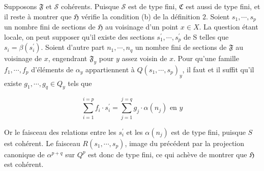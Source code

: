 Supposons $\mathfrak{F}$ et $\mathcal{S}$ cohérents. Puisque $\mathcal{S}$ est de type fini, $\mathfrak{C}$ est aussi de type fini, et il reste à montrer que $\mathfrak{H}$ vérifie la condition (b) de la définition $2 .$ Soient $s_{1}, \cdots, s_{p}$ un nombre fini de sections de $\mathfrak{H}$ au voisinage d'un point $x \in X .$ La question étant locale, on peut supposer qu'il existe des sections $s_{1}^{\prime}, \cdots, s_{p}^{\prime}$ de S telles que $s_{i}=\beta\left(s_{i}^{\prime}\right)$. Soient d'autre part $n_{1}, \cdots, n_{q}$ un nombre fini de sections de $\mathfrak{F}$ au voisinage de $x$, engendrant $\mathfrak{F}_{y}$ pour $y$ assez voisin de $x$. Pour qu'une famille $f_{1}, \cdots, f_{p}$ d'éléments de $\alpha_{y}$ appartiennent à $Q\left(s_{1}, \cdots, s_{p}\right)_{y}$, il faut et il suffit qu'il existe $g_{1}, \cdots, g_{q} \in Q_{y}$ tels que

$$
\sum_{i=1}^{i=p} f_{i} \cdot s_{i}^{\prime}=\sum_{j=1}^{j=q} g_{j} \cdot \alpha\left(n_{j}\right) \text { en } y
$$

Or le faisceau des relations entre les $s_{i}^{\prime}$ et les $\alpha\left(n_{j}\right)$ est de type fini, puisque $S$ est cohérent. Le faisceau $R\left(s_{1}, \cdots, s_{p}\right)$, image du précédent par la projection canonique de $\alpha^{p+q}$ sur $Q^{p}$ est donc de type fini, ce qui achève de montrer que $\mathfrak{H}$ est cohérent.

